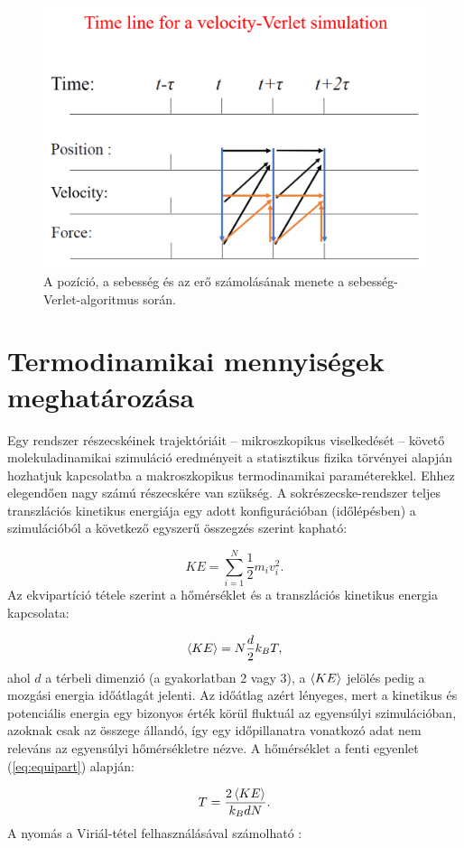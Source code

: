 \documentclass[12pt]{article}
\theoremstyle{plain}
\begin{document}
\begin{figure}
	\centering
	\includegraphics[width=0.5\linewidth]{media/velVerlet_timeline}
	\caption{A pozíció, a sebesség és az erő számolásának menete a sebesség-Verlet-algoritmus során.}
	\label{fig:velverlettimeline}
\end{figure}



\section{Termodinamikai mennyiségek meghatározása}

Egy rendszer részecskéinek trajektóriáit -- mikroszkopikus viselkedését -- követő molekuladinamikai szimuláció eredményeit a statisztikus fizika törvényei alapján  hozhatjuk kapcsolatba a makroszkopikus termodinamikai paraméterekkel. Ehhez elegendően nagy számú részecskére van szükség. A sokrészecske-rendszer teljes transzlációs kinetikus energiája egy adott konfigurációban (időlépésben) a szimulációból a következő egyszerű összegzés szerint kapható:

\begin{equation}
	KE = \sum_{i=1}^{N} \frac{1}{2} m_i v_i^2.
	\label{eq:Ekin}
\end{equation}
Az ekvipartíció tétele szerint a hőmérséklet és a transzlációs kinetikus energia kapcsolata:

\begin{equation}
	\braket{KE} = N \frac{d}{2} k_B T,
	\label{eq:equipart}
\end{equation}
ahol $d$ a térbeli dimenzió (a gyakorlatban 2 vagy 3), a $\braket{KE}$ jelölés pedig a mozgási energia időátlagát jelenti. Az időátlag azért lényeges, mert a kinetikus és potenciális energia egy bizonyos érték körül fluktuál az egyensúlyi szimulációban, azoknak csak az összege állandó, így egy időpillanatra vonatkozó adat nem releváns az egyensúlyi hőmérsékletre nézve. A hőmérséklet a fenti egyenlet (\ref{eq:equipart}) alapján:

\begin{equation}
	T = \frac{2 \braket{KE}}{k_B d N}.
	\label{eq:temperature}
\end{equation}
A nyomás a Viriál-tétel felhasználásával számolható \cite{Landau2012, LAMMPS_compute_pressure}:
\end{document}
